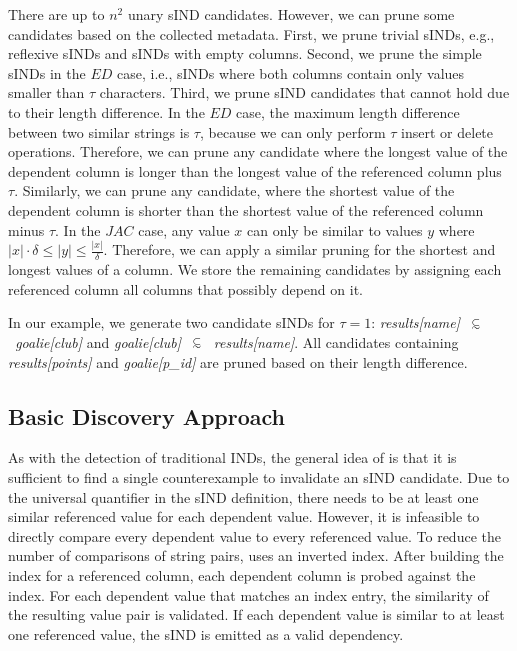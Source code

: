 There are up to $n^2$ unary sIND candidates.
However, we can prune some candidates based on the collected metadata.
First, we prune trivial sINDs, e.g., reflexive sINDs and sINDs with empty columns.
Second, we prune the simple sINDs in the $ED$ case, i.e., sINDs where both columns contain only values smaller than $\tau$ characters. %
Third, we prune sIND candidates that cannot hold due to their length difference.
In the $ED$ case, the maximum length difference between two similar strings is $\tau$, because we can only perform $\tau$ insert or delete operations.
Therefore, we can prune any candidate where the longest value of the dependent column is longer than the longest value of the referenced column plus $\tau$.
Similarly, we can prune any candidate, where the shortest value of the dependent column is shorter than the shortest value of the referenced column minus $\tau$.
In the $JAC$ case, any value $x$ can only be similar to values $y$ where $|x| \cdot \delta \leq |y| \leq \frac{|x|}{\delta}$.
Therefore, we can apply a similar pruning for the shortest and longest values of a column.
We store the remaining candidates by assigning each referenced column all columns that possibly depend on it.

In our example, we generate two candidate sINDs for $\tau = 1$: \mbox{\emph{results[name]~$\simIND{}$~goalie[club]}} and  \mbox{\emph{goalie[club]~$\simIND{}$~results[name]}}.
All candidates containing \mbox{\emph{results[points]}} and \mbox{\emph{goalie[p\_id]}} are pruned based on their length difference.

\subsection{Basic Discovery Approach}
\label{section:impl:sawfish}
As with the detection of traditional INDs, the general idea of \sawfish is that it is sufficient to find a single counterexample to invalidate an sIND candidate.
Due to the universal quantifier in the sIND definition, there needs to be at least one similar referenced value for each dependent value.
However, it is infeasible to directly compare every dependent value to every referenced value.
To reduce the number of comparisons of string pairs, \sawfish uses an inverted index. %
After building the index for a referenced column, each dependent column is probed against the index.
For each dependent value that matches an index entry, the similarity of the resulting value pair is validated.
If each dependent value is similar to at least one referenced value, the sIND is emitted as a valid dependency.

